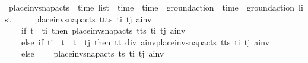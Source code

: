\begin{isabellebody}
\ place{\isacharunderscore}{\kern0pt}inv{\isacharunderscore}{\kern0pt}snap{\isacharunderscore}{\kern0pt}acts\ {\isacharcolon}{\kern0pt}{\isacharcolon}{\kern0pt}\ {\isachardoublequoteopen}time\ list\ {\isasymRightarrow}\ time\ {\isasymRightarrow}\ time\ {\isasymRightarrow}\ ground{\isacharunderscore}{\kern0pt}action\ {\isasymRightarrow}\ {\isacharparenleft}{\kern0pt}time\ {\isasymtimes}\ ground{\isacharunderscore}{\kern0pt}action{\isacharparenright}{\kern0pt}\ list{\isachardoublequoteclose}\ \isanewline
\ \ \ \ {\isachardoublequoteopen}place{\isacharunderscore}{\kern0pt}inv{\isacharunderscore}{\kern0pt}snap{\isacharunderscore}{\kern0pt}acts\ {\isacharparenleft}{\kern0pt}t{\isacharhash}{\kern0pt}t{\isacharprime}{\kern0pt}{\isacharhash}{\kern0pt}ts{\isacharparenright}{\kern0pt}\ t\isactrlsub i\ t\isactrlsub j\ a\isactrlsub i\isactrlsub n\isactrlsub v\ {\isacharequal}{\kern0pt}\ \isanewline
\ \ \ \ {\isacharparenleft}{\kern0pt}if\ t\ {\isacharless}{\kern0pt}\ t\isactrlsub i\ then\ place{\isacharunderscore}{\kern0pt}inv{\isacharunderscore}{\kern0pt}snap{\isacharunderscore}{\kern0pt}acts\ {\isacharparenleft}{\kern0pt}t{\isacharprime}{\kern0pt}{\isacharhash}{\kern0pt}ts{\isacharparenright}{\kern0pt}\ t\isactrlsub i\ t\isactrlsub j\ a\isactrlsub i\isactrlsub n\isactrlsub v\isanewline
\ \ \ \ else\ if\ t\isactrlsub i\ {\isasymle}\ t\ {\isasymand}\ t{\isacharprime}{\kern0pt}\ {\isasymle}\ t\isactrlsub j\ then\ {\isacharparenleft}{\kern0pt}{\isacharparenleft}{\kern0pt}t{\isacharplus}{\kern0pt}t{\isacharprime}{\kern0pt}{\isacharparenright}{\kern0pt}\ div\ {}{\isacharcomma}{\kern0pt}a\isactrlsub i\isactrlsub n\isactrlsub v{\isacharparenright}{\kern0pt}{\isacharhash}{\kern0pt}{\isacharparenleft}{\kern0pt}place{\isacharunderscore}{\kern0pt}inv{\isacharunderscore}{\kern0pt}snap{\isacharunderscore}{\kern0pt}acts\ {\isacharparenleft}{\kern0pt}t{\isacharprime}{\kern0pt}{\isacharhash}{\kern0pt}ts{\isacharparenright}{\kern0pt}\ t\isactrlsub i\ t\isactrlsub j\ a\isactrlsub i\isactrlsub n\isactrlsub v{\isacharparenright}{\kern0pt}\isanewline
\ \ \ \ else\ {\isacharbrackleft}{\kern0pt}{\isacharbrackright}{\kern0pt}{\isacharparenright}{\kern0pt}{\isachardoublequoteclose}\isanewline
\ \ {\isacharbar}{\kern0pt}\ {\isachardoublequoteopen}place{\isacharunderscore}{\kern0pt}inv{\isacharunderscore}{\kern0pt}snap{\isacharunderscore}{\kern0pt}acts\ ts\ t\isactrlsub i\ t\isactrlsub j\ a\isactrlsub i\isactrlsub n\isactrlsub v\ {\isacharequal}{\kern0pt}\ {\isacharbrackleft}{\kern0pt}{\isacharbrackright}{\kern0pt}{\isachardoublequoteclose}\isanewline
\ \ \isanewline

\end{isabellebody}
